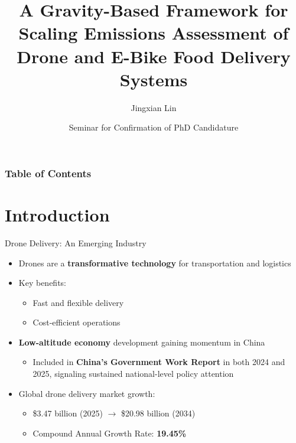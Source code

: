 \documentclass[9pt]{beamer}
\title[Drones for Food Delivery] %
{A Gravity-Based Framework for Scaling Emissions Assessment of Drone and E-Bike Food Delivery Systems}
\author[Jingxian Lin] %
{Jingxian Lin}
\institute[HKU] %
{
  Department of Civil Engineering\\
  The University of Hong Kong
}
\date[\today] %
{Seminar for Confirmation of PhD Candidature}
\begin{document}
\frame{\titlepage}

\begin{frame}
  \frametitle{Table of Contents}
  \tableofcontents
\end{frame}

\section{Introduction}

\begin{frame}{Drone Delivery: An Emerging Industry}
  \begin{itemize}
    \item Drones are a \textbf{transformative technology} for transportation and logistics
    \item Key benefits:
      \begin{itemize}
        \item Fast and flexible delivery
        \item Cost-efficient operations
      \end{itemize}
    \item \textbf{Low-altitude economy} development gaining momentum in China
      \begin{itemize}
        \item Included in \textbf{China’s Government Work Report} in both 2024 and 2025, signaling sustained national-level policy attention
      \end{itemize}
    \item Global drone delivery market growth:
      \begin{itemize}
        \item \$3.47 billion (2025) $\rightarrow$ \$20.98 billion (2034)
        \item Compound Annual Growth Rate: \textbf{19.45\%}
      \end{itemize}
  \end{itemize}
\end{frame}
\end{document}
